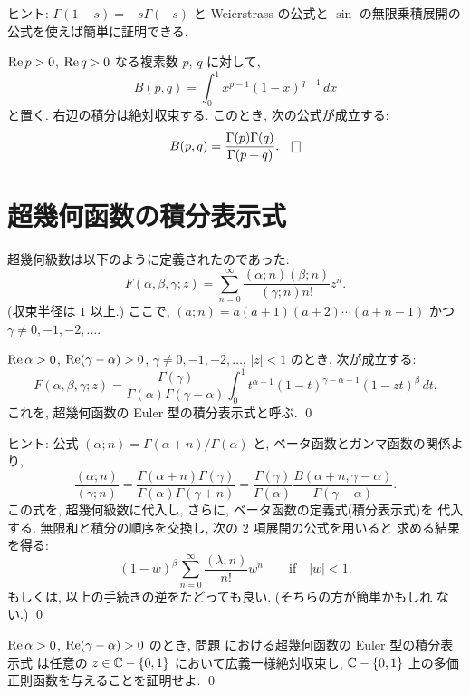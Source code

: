 \documentclass[12pt,twoside]{jarticle}
\begin{document}
\noindent ヒント: $\Gamma(1-s)=-s\Gamma(-s)$ と Weierstrass の公式と 
$\sin$ の無限乗積展開の公式を使えば簡単に証明できる.

\begin{question}[ベータ函数との関係]
  $\mathop{\mathrm{Re}}\nolimits p > 0$, $\mathop{\mathrm{Re}}\nolimits q > 0$ なる複素数 $p$, $q$ に対して,
  \[
    B(p,q) = \int_0^1 x^{p-1} (1-x)^{q-1}\,dx
  \]%
と置く. 右辺の積分は絶対収束する. このとき, 次の公式が成立する:
  \[
    B(p,q) = \frac{\Gamma(p)\Gamma(q)}{\Gamma(p+q)}.
  \qed
  \]
\end{question}


\section{超幾何函数の積分表示式}

超幾何級数は以下のように定義されたのであった:
\[
  F(\alpha,\beta,\gamma; z) 
  = \sum_{n=0}^{\infty} \frac{(\alpha;n)(\beta;n)}{(\gamma;n)n!} z^n.
\]%
(収束半径は $1$ 以上.) ここで, $(a;n) = a(a+1)(a+2)\cdots(a+n-1)$ かつ %
$\gamma \ne 0,-1,-2,\dots$.

\begin{question}\label{q:hypergeom-Euler-1}
  $\mathop{\mathrm{Re}}\nolimits \alpha > 0$, $\mathop{\mathrm{Re}}\nolimits(\gamma-\alpha) > 0$, %
  $\gamma \ne 0,-1,-2, \dots$, $|z|<1$ のとき, 次が成立する:
  \[
    F(\alpha,\beta,\gamma; z)
    =
    \frac{\Gamma(\gamma)}{\Gamma(\alpha)\Gamma(\gamma-\alpha)}
    \int_0^1 t^{\alpha-1} (1 - t)^{\gamma-\alpha-1} (1 - zt)^\beta \,dt.
  \]%
  これを, 超幾何函数の Euler 型の積分表示式と呼ぶ.
  \qed
\end{question}

\noindent ヒント: 公式 $(\alpha;n)=\Gamma(\alpha+n)/\Gamma(\alpha)$ と, 
ベータ函数とガンマ函数の関係より,
\[
  \frac{(\alpha;n)}{(\gamma;n)}
  =
  \frac{\Gamma(\alpha+n)\Gamma(\gamma)}{\Gamma(\alpha)\Gamma(\gamma+n)}
  =
  \frac{\Gamma(\gamma)}{\Gamma(\alpha)}
  \frac{B(\alpha+n,\gamma-\alpha)}{\Gamma(\gamma-\alpha)}.
\]%
この式を, 超幾何級数に代入し, さらに, ベータ函数の定義式(積分表示式)を
代入する. 無限和と積分の順序を交換し, 次の $2$ 項展開の公式を用いると
求める結果を得る:
\[
  (1 - w)^\beta \sum_{n=0}^\infty \frac{(\lambda;n)}{n!}w^n
  \qquad\text{if}\quad |w|<1.
\]%
もしくは, 以上の手続きの逆をたどっても良い. (そちらの方が簡単かもしれ
ない.)
\qed

\begin{question}
  $\mathop{\mathrm{Re}}\nolimits \alpha > 0$, $\mathop{\mathrm{Re}}\nolimits(\gamma-\alpha) > 0$ のとき, 問題 
   における超幾何函数の Euler 型の積分表示式
  は任意の $z\in{\mathbb C}-\{0,1\}$ において広義一様絶対収束し, ${\mathbb C}-\{0,1\}$ 
  上の多価正則函数を与えることを証明せよ.
  \qed
\end{question}
\end{document}
